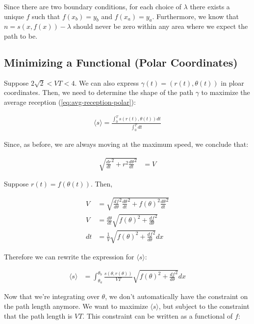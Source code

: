 \documentclass{article}
\begin{document}
Since there are two boundary conditions, for each choice of $\lambda$ there
	exists a unique $f$ such that $f(x_b) = y_b$ and $f(x_a) = y_a$.
Furthermore, we know that $n = s(x,f(x)) - \lambda$ should never be zero
	within any area where we expect the path to be.


\subsection{Minimizing a Functional (Polar Coordinates)} 
Suppose $2 \sqrt{2} < V T < 4  $.
We can also express $\gamma(t) = (r(t), \theta(t))$ in ploar coordinates.
Then, we need to determine the shape of the path $\gamma$ to maximize the
	average reception (\ref{eq:avg-reception-polar}):

\begin{align}
\langle s \rangle = \frac{\int_0^T s(r(t),\theta(t)) dt}{\int_0^T dt} 
	\label{eq:avg-reception-polar}
\end{align}

Since, as before, we are always moving at the maximum speed, we conclude that:

\begin{align}
\sqrt{\frac{dr}{dt}^2 + r^2\frac{d\theta}{dt}^2} & = V
\end{align}

Suppose $r(t) = f(\theta(t))$.
Then,

\begin{align}
V & = \sqrt{\frac{df}{d\theta}^2\frac{d\theta}{dt}^2 + f(\theta)^2\frac{d\theta}{dt}^2}  \nonumber \\
V & = \frac{d\theta}{dt} \sqrt{ f(\theta)^2 + \frac{df}{d\theta}^2}  \nonumber \\
dt & = \frac{1}{V} \sqrt{f(\theta)^2 + \frac{df}{d\theta}^2} dx \label{eq:dt-to-dtheta}
\end{align}

Therefore we can rewrite the expression for $\langle s \rangle$:

\begin{align}
\langle s \rangle & = \int_{\theta_a}^{\theta_b} 
	\frac{s(\theta, r(\theta))}{VT} \sqrt{f(\theta)^2 + \frac{df}{d\theta}^2} dx 
	\label{eq:path-integral-polar}
\end{align}

Now that we're integrating over $\theta$, we don't automatically have the constraint
	on the path length anymore.
We want to maximize $\langle s \rangle$, but subject to the constraint that the
	path length is $V T$.
This constraint can be written as a functional of $f$:
\end{document}
